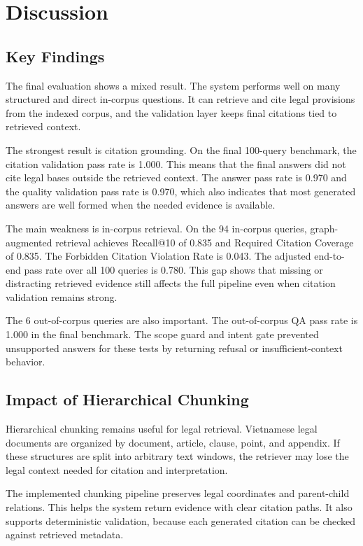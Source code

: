 \chapter{Discussion}
\label{ch:discussion}

\section{Key Findings}
The final evaluation shows a mixed result. The system performs well on many structured and direct in-corpus questions. It can retrieve and cite legal provisions from the indexed corpus, and the validation layer keeps final citations tied to retrieved context.

The strongest result is citation grounding. On the final 100-query benchmark, the citation validation pass rate is 1.000. This means that the final answers did not cite legal bases outside the retrieved context. The answer pass rate is 0.970 and the quality validation pass rate is 0.970, which also indicates that most generated answers are well formed when the needed evidence is available.

The main weakness is in-corpus retrieval. On the 94 in-corpus queries, graph-augmented retrieval achieves Recall@10 of 0.835 and Required Citation Coverage of 0.835. The Forbidden Citation Violation Rate is 0.043. The adjusted end-to-end pass rate over all 100 queries is 0.780. This gap shows that missing or distracting retrieved evidence still affects the full pipeline even when citation validation remains strong.

The 6 out-of-corpus queries are also important. The out-of-corpus QA pass rate is 1.000 in the final benchmark. The scope guard and intent gate prevented unsupported answers for these tests by returning refusal or insufficient-context behavior.

\section{Impact of Hierarchical Chunking}
Hierarchical chunking remains useful for legal retrieval. Vietnamese legal documents are organized by document, article, clause, point, and appendix. If these structures are split into arbitrary text windows, the retriever may lose the legal context needed for citation and interpretation.

The implemented chunking pipeline preserves legal coordinates and parent-child relations. This helps the system return evidence with clear citation paths. It also supports deterministic validation, because each generated citation can be checked against retrieved metadata.

